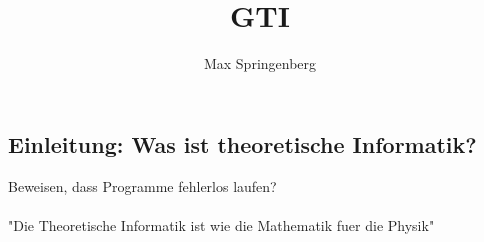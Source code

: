 \documentclass{article}
\author{Max Springenberg}
\title{GTI}
\begin{document}
\maketitle
\subsection{Einleitung: Was ist theoretische Informatik?}
Beweisen, dass Programme fehlerlos laufen?\\
\\
"Die Theoretische Informatik ist wie die Mathematik fuer die Physik"\\
\subsubsection{}
\end{document}
